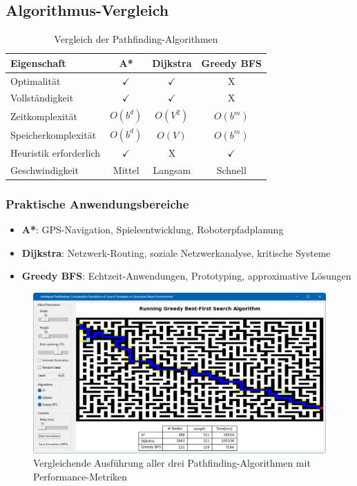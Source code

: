 \documentclass[12pt,a4paper]{article}
\begin{document}
\subsection{Algorithmus-Vergleich}

\begin{table}[H]
\centering
\begin{tabular}{lccc}
\toprule
\textbf{Eigenschaft} & \textbf{A*} & \textbf{Dijkstra} & \textbf{Greedy BFS} \\
\midrule
Optimalität & $\checkmark$ & $\checkmark$ & X \\
Vollständigkeit & $\checkmark$ & $\checkmark$ & X \\
Zeitkomplexität & $O(b^d)$ & $O(V^2)$ & $O(b^m)$ \\
Speicherkomplexität & $O(b^d)$ & $O(V)$ & $O(b^m)$ \\
Heuristik erforderlich & $\checkmark$ & X & $\checkmark$ \\
Geschwindigkeit & Mittel & Langsam & Schnell \\
\bottomrule
\end{tabular}
\caption{Vergleich der Pathfinding-Algorithmen}
\end{table}

\subsubsection{Praktische Anwendungsbereiche}

\begin{itemize}
    \item \textbf{A*}: GPS-Navigation, Spieleentwicklung, Roboterpfadplanung
    \item \textbf{Dijkstra}: Netzwerk-Routing, soziale Netzwerkanalyse, kritische Systeme
    \item \textbf{Greedy BFS}: Echtzeit-Anwendungen, Prototyping, approximative Lösungen
\end{itemize}

\begin{figure}[H]
\centering
\includegraphics[width=\textwidth]{run.png}
\caption{Vergleichende Ausführung aller drei Pathfinding-Algorithmen mit Performance-Metriken}
\label{fig:algorithms}
\end{figure}
\end{document}
